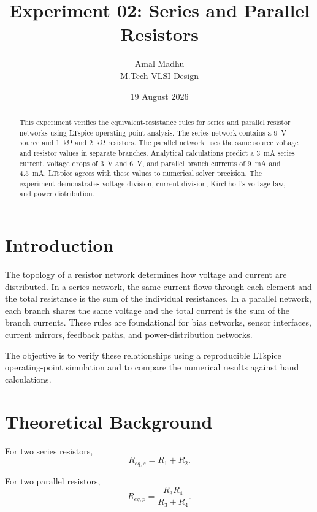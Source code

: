 \documentclass[11pt,a4paper]{article}
\title{Experiment 02: Series and Parallel Resistors}
\author{Amal Madhu\\M.Tech VLSI Design}
\date{19 August 2026}
\begin{document}
\maketitle

\begin{abstract}
This experiment verifies the equivalent-resistance rules for series and parallel resistor networks using LTspice operating-point analysis. The series network contains a \SI{9}{\volt} source and \SI{1}{\kilo\ohm} and \SI{2}{\kilo\ohm} resistors. The parallel network uses the same source voltage and resistor values in separate branches. Analytical calculations predict a \SI{3}{\milli\ampere} series current, voltage drops of \SI{3}{\volt} and \SI{6}{\volt}, and parallel branch currents of \SI{9}{\milli\ampere} and \SI{4.5}{\milli\ampere}. LTspice agrees with these values to numerical solver precision. The experiment demonstrates voltage division, current division, Kirchhoff's voltage law, and power distribution.
\end{abstract}

\section{Introduction}

The topology of a resistor network determines how voltage and current are distributed. In a series network, the same current flows through each element and the total resistance is the sum of the individual resistances. In a parallel network, each branch shares the same voltage and the total current is the sum of the branch currents. These rules are foundational for bias networks, sensor interfaces, current mirrors, feedback paths, and power-distribution networks.

The objective is to verify these relationships using a reproducible LTspice operating-point simulation and to compare the numerical results against hand calculations.

\section{Theoretical Background}

For two series resistors,
\begin{equation}
R_{eq,s}=R_1+R_2.
\end{equation}

For two parallel resistors,
\begin{equation}
R_{eq,p}=\frac{R_3R_4}{R_3+R_4}.
\end{equation}
\end{document}
